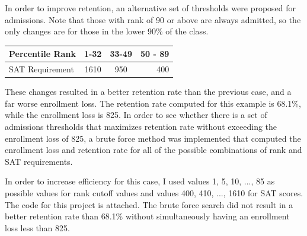 \documentclass{article}
\begin{document}
In order to improve retention, an alternative set of thresholds were proposed for admissions. 
Note that those with rank of 90 or above are always admitted, so the only changes are for those 
in the lower 90\% of the class. 

\begin{center}
\begin{tabular}{|l|c|c|r|}
\hline
Percentile Rank & 1-32 & 33-49 & 50 - 89 \\ \hline
SAT Requirement & 1610 & 950 & 400 \\ \hline
\end{tabular}
\end{center}

These changes resulted in a better retention rate than the previous case, and a far worse enrollment loss. 
The retention rate computed for this example is 68.1\%, while the enrollment loss is 825. 
In order to see whether there is a set of admissions thresholds that maximizes retention rate without exceeding 
the enrollment loss of 825, a brute force method was implemented that computed the enrollment loss and 
retention rate for all of the possible combinations of rank and SAT requirements. 

In order to increase efficiency for this case, I used values 1, 5, 10, ..., 85 as possible 
values for rank cutoff values and values 400, 410, ..., 1610 for SAT scores. The code for this 
project is attached. The brute force search did not result in a better retention rate than 68.1\% without 
simultaneously having an enrollment loss less than 825. 
\end{document}
